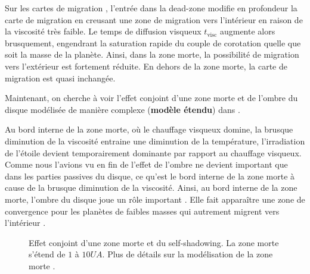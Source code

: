Sur les cartes de migration , l'entrée dans la dead-zone modifie en profondeur la carte de migration en creusant une zone de migration vers l'intérieur en raison de la viscosité très faible. Le temps de diffusion visqueux $t_\text{visc}$ augmente alors brusquement, engendrant la saturation rapide du couple de corotation quelle que soit la masse de la planète. Ainsi, dans la zone morte, la possibilité de migration vers l'extérieur est fortement réduite. En dehors de la zone morte, la carte de migration est quasi inchangée.

\bigskip

Maintenant, on cherche à voir l'effet conjoint d'une zone morte et de l'ombre du disque modélisée de manière complexe (\textbf{modèle étendu}) dans .

Au bord interne de la zone morte, où le chauffage visqueux domine, la brusque diminution de la viscosité entraine une diminution de la température, l'irradiation de l'étoile devient temporairement dominante par rapport au chauffage visqueux. Comme nous l'avions vu en fin de  l'effet de l'ombre ne devient important que dans les parties passives du disque, ce qu'est le bord interne de la zone morte à cause de la brusque diminution de la viscosité. Ainsi, au bord interne de la zone morte, l'ombre du disque joue un rôle important . Elle fait apparaître une zone de convergence pour les planètes de faibles masses qui autrement migrent vers l'intérieur .

\begin{figure}[htbp]
\centering
{}\hfill
{}

\caption{Effet conjoint d'une zone morte et du \og self-shadowing\fg. La zone morte s'étend de $1$ à $10\unit{UA}$. Plus de détails sur la modélisation de la zone morte \protect{}. }\label{fig:dz_shadow}
\end{figure}

